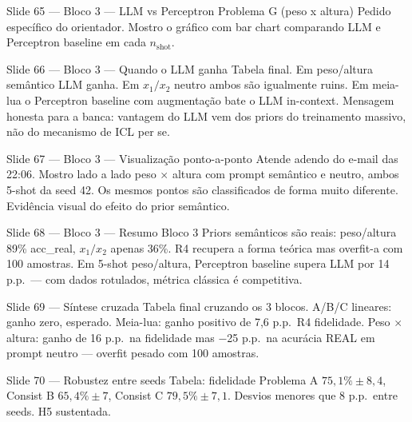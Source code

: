 \documentclass[aspectratio=169,10pt]{beamer}
\begin{document}
\begin{frame}{Slide 65 --- Bloco 3 --- LLM vs Perceptron Problema G (peso x altura)}
\footnotesize
Pedido espec\'ifico do orientador. Mostro o gr\'afico com bar chart comparando LLM e Perceptron baseline em cada $n_{\text{shot}}$.
\end{frame}

\begin{frame}{Slide 66 --- Bloco 3 --- Quando o LLM ganha}
\footnotesize
Tabela final. Em peso/altura sem\^antico LLM ganha. Em $x_1/x_2$ neutro ambos s\~ao igualmente ruins. Em meia-lua o Perceptron baseline com augmenta\c{c}\~ao bate o LLM in-context. Mensagem honesta para a banca: vantagem do LLM vem dos priors do treinamento massivo, n\~ao do mecanismo de ICL per se.
\end{frame}

\begin{frame}{Slide 67 --- Bloco 3 --- Visualiza\c{c}\~ao ponto-a-ponto}
\footnotesize
Atende adendo do e-mail das 22:06. Mostro lado a lado peso $\times$ altura com prompt sem\^antico e neutro, ambos 5-shot da seed 42. Os mesmos pontos s\~ao classificados de forma muito diferente. Evid\^encia visual do efeito do prior sem\^antico.
\end{frame}

\begin{frame}{Slide 68 --- Bloco 3 --- Resumo Bloco 3}
\footnotesize
Priors sem\^anticos s\~ao reais: peso/altura 89\% acc\_real, $x_1/x_2$ apenas 36\%. R4 recupera a forma te\'orica mas overfit-a com 100 amostras. Em 5-shot peso/altura, Perceptron baseline supera LLM por 14 p.p.\ --- com dados rotulados, m\'etrica cl\'assica \'e competitiva.
\end{frame}

\begin{frame}{Slide 69 --- S\'intese cruzada}
\footnotesize
Tabela final cruzando os 3 blocos. A/B/C lineares: ganho zero, esperado. Meia-lua: ganho positivo de 7,6 p.p.\ R4 fidelidade. Peso $\times$ altura: ganho de 16 p.p.\ na fidelidade mas $-$25 p.p.\ na acur\'acia REAL em prompt neutro --- overfit pesado com 100 amostras.
\end{frame}

\begin{frame}{Slide 70 --- Robustez entre seeds}
\footnotesize
Tabela: fidelidade Problema A $75{,}1\% \pm 8{,}4$, Consist B $65{,}4\% \pm 7$, Consist C $79{,}5\% \pm 7{,}1$. Desvios menores que 8 p.p.\ entre seeds. H5 sustentada.
\end{frame}
\end{document}
